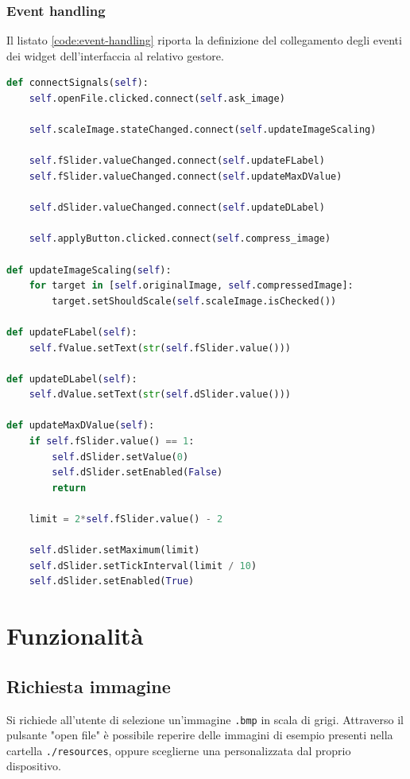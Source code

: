 \documentclass[11pt,italian]{article}
\begin{document}
\subsubsection*{Event handling}
Il listato \cref{code:event-handling} riporta la definizione del collegamento degli eventi dei widget dell'interfaccia al relativo gestore.
\begin{lstlisting}[language=Python,emph={self},label=code:event-handling,caption=Event-handling dei segnali dei widget]
def connectSignals(self):
    self.openFile.clicked.connect(self.ask_image)

    self.scaleImage.stateChanged.connect(self.updateImageScaling)

    self.fSlider.valueChanged.connect(self.updateFLabel)
    self.fSlider.valueChanged.connect(self.updateMaxDValue)

    self.dSlider.valueChanged.connect(self.updateDLabel)

    self.applyButton.clicked.connect(self.compress_image)

def updateImageScaling(self):
    for target in [self.originalImage, self.compressedImage]:
        target.setShouldScale(self.scaleImage.isChecked())

def updateFLabel(self):
    self.fValue.setText(str(self.fSlider.value()))

def updateDLabel(self):
    self.dValue.setText(str(self.dSlider.value()))

def updateMaxDValue(self):
    if self.fSlider.value() == 1:
        self.dSlider.setValue(0)
        self.dSlider.setEnabled(False)
        return

    limit = 2*self.fSlider.value() - 2

    self.dSlider.setMaximum(limit)
    self.dSlider.setTickInterval(limit / 10)
    self.dSlider.setEnabled(True)
\end{lstlisting}

\newpage
\section{Funzionalità}
\subsection{Richiesta immagine}
Si richiede all’utente di selezione un'immagine \lstinline{.bmp} in scala di grigi. Attraverso il pulsante "open file" è possibile reperire delle immagini di esempio presenti nella cartella \lstinline{./resources}, oppure sceglierne una personalizzata dal proprio dispositivo.
\end{document}
